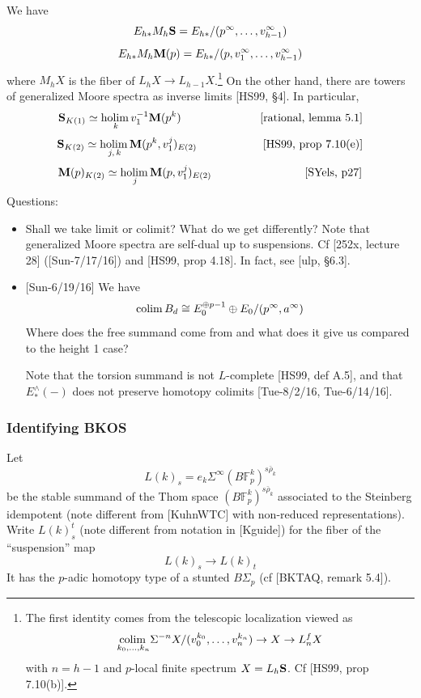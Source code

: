 \documentclass{rs}
\theoremstyle{definition}
\theoremstyle{remark}
\newcommand{\mb}[1]{\mathbb{#1}}
\newcommand{\holim}{{\rm holim}\,}
\newcommand{\colim}{{\rm colim}\,}
\newcommand{\bm}{{\bf M}}
\newcommand{\bs}{{\bf S}}
\newcommand{\BF}{{\mb F}}
\renewcommand{\=}{\approx}
\renewcommand{\-}{\sim}
\numberwithin{equation}{section}
\numberwithin{thm}{section}
\begin{document}
We have 
\[
 E_{h*} M_h \bs = E_{h*} / (p^\infty, \ldots, v_{h - 1}^\infty) 
\]
\[
 E_{h*} M_h \bm(p) = E_{h*} / (p, v_1^\infty, \ldots, v_{h - 1}^\infty) 
\]
where $M_h X$ is the fiber of $L_h X \to L_{h - 1} X$.\footnote{The first identity 
comes from the telescopic localization viewed as 
\[
 \underset{k_0, \ldots, k_n}{\colim} \Sigma^{-n} X / (v_0^{k_0}, \ldots, v_n^{k_n}) \to X \to L^f_n X 
\]
with $n = h - 1$ and $p$-local finite spectrum $X = L_h \bs$.  Cf [HS99, prop 7.10(b)].  }  
On the other hand, there are towers of generalized Moore spectra as inverse limits [HS99, \S 4].  
In particular, 
\[
 \bs_{K(1)} \simeq \underset{k}{\holim} v_1^{-1}\bm(p^k) \hskip 2.45cm \text{[rational, lemma 5.1]} 
\]
\[
 \bs_{K(2)} \simeq \underset{j, \, k}{\holim} \bm(p^k, v_1^j)_{E(2)} \hskip 2.05cm \text{[HS99, prop 7.10(e)]} 
\]
\[
 \bm(p)_{K(2)} \simeq \underset{j}{\holim} \bm(p, v_1^j)_{E(2)} \hskip 2.9cm \text{[SYels, p27]} 
\]
Questions: 
\begin{itemize}
 \item Shall we take limit or colimit?  What do we get differently?  
 Note that generalized Moore spectra are self-dual up to suspensions.  
 Cf [252x, lecture 28] ([Sun-7/17/16]) and [HS99, prop 4.18].  
 In fact, see [ulp, \S 6.3].  

 \item {[Sun-6/19/16]} We have 
 \[
  \colim B_d \cong E_0^{\oplus p - 1} \oplus E_0 / (p^\infty, a^\infty) 
 \]
 Where does the free summand come from 
 and what does it give us compared to the height 1 case?  

 Note that the torsion summand is not $L$-complete [HS99, def A.5], 
 and that $E^\wedge_*(-)$ does not preserve homotopy colimits [Tue-8/2/16, Tue-6/14/16].  
\end{itemize}


\subsubsection{Identifying BKOS}

Let 
\[
 L(k)_s = e_k \Sigma^\infty (B\BF_p^k)^{s \bar{\rho}_k} 
\]
be the stable summand of the Thom space $(B\BF_p^k)^{s\bar{\rho}_k}$ 
associated to the Steinberg idempotent 
(note different from [KuhnWTC] with non-reduced representations).  
Write $L(k)_s^t$ (note different from notation in [Kguide]) 
for the fiber of the ``suspension'' map 
\[
 L(k)_s \to L(k)_t 
\]
It has the $p$-adic homotopy type of a stunted $B\Sigma_p$ 
(cf [BKTAQ, remark 5.4]).  
\end{document}
